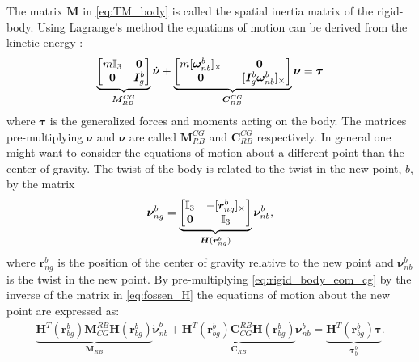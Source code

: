 The matrix $\bm{M}$ in \autoref{eq:TM_body} is called the spatial inertia matrix of the rigid-body.
Using Lagrange's method the equations of motion can be derived from the kinetic energy \cite{fossen2021}:
\begin{align}
    \underbrace{
    \begin{bmatrix}
        m \mathbb{I}_{3} & \bm{0} \\
        \bm{0} & \bm{I}_g^b
    \end{bmatrix}
}_{\bm{M}_{RB}^{CG}} \dot{\bm{\nu}}
    +
    \underbrace{
    \begin{bmatrix}
        m [\bm{\omega}_{nb}^b]_{\times} & \bm{0} \\
        \bm{0} & -[\bm{I}_g^b \bm{\omega}_{nb}^b]_{\times}
    \end{bmatrix}
}_{\bm{C}_{RB}^{CG}}\bm{\nu} = \bm{\tau}
    \label{eq:rigid_body_eom_cg}
\end{align}
where $\bm{\tau}$ is the generalized forces and moments acting on the body. The matrices
pre-multiplying $\dot{\bm{\nu}}$ and $\bm{\nu}$ are called $\bm{M}_{RB}^{CG}$ and $\bm{C}_{RB}^{CG}$ respectively. In general one might want to consider the equations of motion
about a different point than the center of gravity. The twist of the body is
related to the twist in the new point, $b$, by the matrix \cite{fossen2021}
\begin{align}
        \bm{\nu}_{ng}^{b} =
    \underbrace{
        \begin{bmatrix}
            \mathbb{I}_{3} & -[\bm{r}_{ng}^{b}]_{\times} \\
            \bm{0} & \mathbb{I}_{3}
        \end{bmatrix}
    }_{\bm{H}(\bm{r}_{ng}^b)}
    \bm{\nu}_{nb}^{b},
    \label{eq:fossen_H}
\end{align}
where $\bm{r}_{ng}^{b}$ is the position of the center of gravity relative to the
new point and $\bm{\nu}_{nb}^{b}$ is the twist in the new point. By
pre-multiplying \autoref{eq:rigid_body_eom_cg} by the inverse of the matrix
in \autoref{eq:fossen_H} the equations of motion about the new point are expressed as:
\begin{align}
    \underbrace{
        \bm{H}^T(\bm{r}_{bg}^b) \bm{M}_{CG}^{RB} \bm{H}(\bm{r}_{bg}^b)
    }_{\bm{M}_{RB}}
    \dot{\bm{\nu}}_{nb}^b
    + \underbrace{
        \bm{H}^T(\bm{r}_{bg}^b) \bm{C}_{CG}^{RB} \bm{H}(\bm{r}_{bg}^b)
    }_{\bm{C}_{RB}}
    \bm{\nu}_{nb}^b
    = \underbrace{
        \bm{H}^T(\bm{r}_{bg}^b)
    \bm{\tau}
    }_{\bm{\tau}_{b}^b}.
\end{align}
